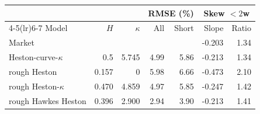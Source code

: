 \begin{tabular}{lrrrrrr}
\toprule
 & & & \multicolumn{2}{c}{RMSE (\%)} & \multicolumn{2}{c}{Skew $<2$w}\\
\cmidrule(lr){4-5}\cmidrule(lr){6-7}
Model & $H$ & $\kappa$ & All & Short & Slope & Ratio\\
\midrule
Market & & & & & -0.203 & 1.34\\
\addlinespace
Heston-curve-$\kappa$ & 0.5 & 5.745 & 4.99 & 5.86 & -0.213 & 1.34\\
rough Heston & 0.157 & 0 & 5.98 & 6.66 & -0.473 & 2.10\\
rough Heston-$\kappa$ & 0.470 & 4.859 & 4.97 & 5.85 & -0.247 & 1.42\\
rough Hawkes Heston & 0.396 & 2.900 & 2.94 & 3.90 & -0.213 & 1.41\\
\bottomrule
\end{tabular}
